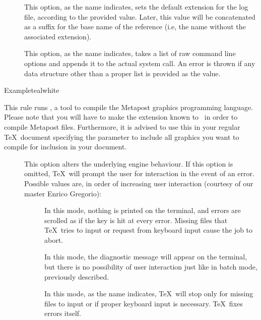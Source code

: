 \begin{description}
\begin{description}
\item[] This option, as the name indicates, sets the default extension for the log file, according to the provided value. Later, this value will be concatenated as a suffix for the base name of the  reference (i.e, the name without the associated extension).

\item[] This option, as the name indicates, takes a list of raw command line options and appends it to the actual system call. An error is thrown if any data structure other than a proper list is provided as the value.
\end{description}

\begin{codebox}{Example}{teal}{\icnote}{white}
\end{codebox}

\item[\rulebox{metapost}]
This rule runs , a tool to compile the Metapost graphics programming language. Please note that you will have to make the  extension known to \arara\ in order to compile Metapost files. Furthermore, it is advised to use this in your regular \TeX\ document specifying the  parameter to include all graphics you want to compile for inclusion in your document.

\begin{description}
\item[] This option alters the underlying engine behaviour. If this option is omitted, \TeX\ will prompt the user for interaction in the event of an error. Possible values are, in order of increasing user interaction (courtesy of our master Enrico Gregorio):

\begin{description}
\item[] In this mode, nothing is printed on the terminal, and errors are scrolled as if the  key is hit at every error. Missing files that \TeX\ tries to input or request from keyboard input cause the job to abort.

\item[] In this mode, the diagnostic message will appear on the terminal, but there is no possibility of user interaction just like in batch mode, previously described.

\item[] In this mode, as the name indicates, \TeX\ will stop only for missing files to input or if proper keyboard input is necessary. \TeX\ fixes errors itself.


\end{description}
\end{description}
\end{description}
